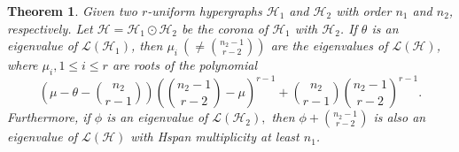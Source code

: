 \documentclass[10pt,a4paper]{article}
\newtheorem{theorem}{Theorem}[section]
\begin{document}
	
	\begin{theorem}
		Given two $r$-uniform hypergraphs $\mathcal{H}_1$ and $\mathcal{H}_2$ with order $n_1$ and $n_2$, respectively.
		Let $\mathcal{H} = \mathcal{H}_1 \odot \mathcal{H}_2$ be the corona of $\mathcal{H}_1$ with $\mathcal{H}_2$. 
		If $\theta$ is an eigenvalue of $\mathcal{L}(\mathcal{H}_1)$, then $\mu_i ~(\neq \binom{n_2-1}{r-2})$ are the eigenvalues of $\mathcal{L}(\mathcal{H})$, where $\mu_i, 1\leq i \leq r$ are roots of the polynomial $$\left(\mu-\theta-\binom{n_2}{r-1}\right)\left(\binom{n_2-1}{r-2}-\mu\right)^{r-1}+\binom{n_2}{r-1}\binom{n_2-1}{r-2}^{r-1}.$$
		Furthermore, if $\phi$ is an eigenvalue of $\mathcal{L}(\mathcal{H}_2),$ then $\phi+\binom{n_2-1}{r-2}$ is also an eigenvalue of $\mathcal{L}(\mathcal{H})$ with Hspan multiplicity at least $n_1$.
	\end{theorem}
\end{document}
